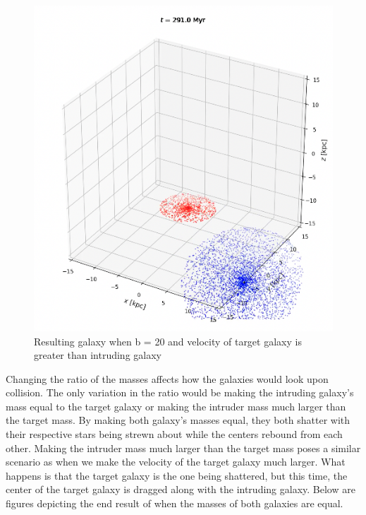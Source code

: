 \documentclass[linenumbers,RNAAS,trackchanges]{aastex631}
\begin{document}
\begin{figure}[H]
    \centering
    \includegraphics[scale=.50]{vip/b20targetv.png}
    \caption{Resulting galaxy when b = 20 and velocity of target galaxy is greater than intruding galaxy}
    \label{fig:code}
\end{figure}

Changing the ratio of the masses affects how the galaxies would look upon collision. The only variation in the ratio would be making the intruding galaxy's mass equal to the target galaxy or making the intruder mass much larger than the target mass. By making both galaxy's masses equal, they both shatter with their respective stars being strewn about while the centers rebound from each other. Making the intruder mass much larger than the target mass poses a similar scenario as when we make the velocity of the target galaxy much larger. What happens is that the target galaxy is the one being shattered, but this time, the center of the target galaxy is dragged along with the intruding galaxy. Below are figures depicting the end result of when the masses of both galaxies are equal.
\end{document}
